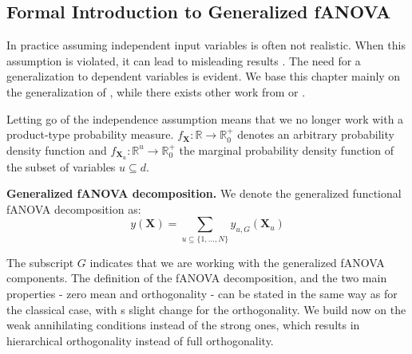 \subsection{Formal Introduction to Generalized fANOVA}
In practice assuming independent input variables is often not realistic. When this assumption is violated, it can lead to misleading results \citep{hooker2007}. The need for a generalization to dependent variables is evident. We base this chapter mainly on the generalization of \cite{rahman2014}, while there exists other work from \cite{hooker2007} or \cite{chastaing2012}.\par

Letting go of the independence assumption means that we no longer work with a product-type probability measure. $f_{\boldsymbol{X}}: \mathbb{R} \rightarrow \mathbb{R}_{0}^{+}$ denotes an arbitrary probability density function and $f_{\boldsymbol{X}_u}: \mathbb{R}^u \rightarrow \mathbb{R}_{0}^{+}$ the marginal probability density function of the subset of variables $u \subseteq d$.\par

\begin{definition}
    \textbf{Generalized fANOVA decomposition.}
    We denote the generalized functional fANOVA decomposition as:
    \begin{equation}
        y(\boldsymbol{X}) = \sum_{u \subseteq \{1, \dots, N\}} y_{u, G}(\boldsymbol{X}_u)
    \end{equation}
\end{definition}
The subscript $G$ indicates that we are working with the generalized fANOVA components.
The definition of the fANOVA decomposition, and the two main properties - zero mean and orthogonality - can be stated in the same way as for the classical case, with s slight change for the orthogonality. We build now on the weak annihilating conditions instead of the strong ones, which results in hierarchical orthogonality instead of full orthogonality.\par

